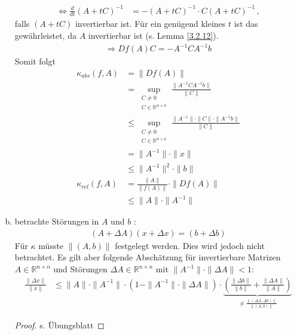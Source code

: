 \documentclass[ngerman,fontsize=11pt, paper=a4, parskip=half, titlepage=true, toc=bib]{scrbook}
\newcommand{\R}{\mathds{R}}
\newcommand{\Renn}{\mathds{R}^{n\times n}}
\begin{document}
\begin{enumerate}[a)]
\begin{align*}
      \Leftrightarrow \frac{d}{dt} (A+ tC)^{-1} 
       &= -(A+tC)^{-1} \cdot C(A+tC)^{-1} \, ,
    \end{align*}
    falls $(A+tC)$ invertierbar ist. Für ein genügend kleines $t$ ist das gewährleistet, da $A$ invertierbar ist (s. Lemma \ref{3.2.12}).
    \begin{gather*}
      \Rightarrow Df(A) C = -A^{-1}CA^{-1}b
    \end{gather*}
    Somit folgt
    \begin{align}
      \nonumber
      \kappa_{abs} (f,A) &= \|Df(A)\| \\ \nonumber
                         &= \sup_{\substack{
                           C\neq 0 \\ 
      C\in \R^{n\times n}											  	
      }}
      \frac{\|A^{-1}CA^{-1}b\|}{\|C\|} \\ \nonumber
                         &\leq \sup_{\substack{
                           C\neq 0 \\ 
      C \in \R^{n\times n}														  	
      }}
      \frac{\|A^{-1}\|\cdot\|C\|\cdot\|A^{-1}b\|}{\|C\|} \\ \nonumber
                         &= \|A^{-1}\| \cdot\|x\| \\ \nonumber
                         &\leq   \|A^{-1}\|^2 \cdot\|b\| \\ \nonumber
      \kappa_{rel}(f,A)  &= \frac{\|A\|}{\|f(A)\|} \cdot \|Df(A)\| \\
                         &\leq \|A\|\cdot \|A^{-1}\| \label{III.2.10}
    \end{align}
  \item betrachte Störungen in $A$ und $b$ :
    \begin{gather*}
      (A+\Delta A)(x+\Delta x) = (b+\Delta b) 
    \end{gather*}
    Für $\kappa$ müsste $\|(A,b)\|$ festgelegt werden. Dies wird jedoch nicht betrachtet. Es gilt aber folgende Abschätzung für invertierbare Matrizen $A\in \Renn $ und Störungen
    $\Delta A \in \R^{n\times n}$ mit $\|A^{-1}\|\cdot \|\Delta A\| < 1$:
    \begin{align}
      \frac{\|\Delta x\|}{\|x\|} & \leq \|A\| \cdot \|A^{-1}\|\cdot (1- \|A^{-1}\|\cdot \|\Delta A\|) 
                                   \cdot
                                   \underbrace{\left(  \frac{\|\Delta b\|}{\|b\|} +  \frac{\|\Delta A\|}{\|A\|}  \right)}_{\neq  \frac{\|(\Delta A, \Delta b)\|}{\|(A,b)\|} }
                                   \label{III.2.11}
    \end{align}
    \begin{proof} s. Übungsblatt \end{proof}
  \end{enumerate}
\end{document}

